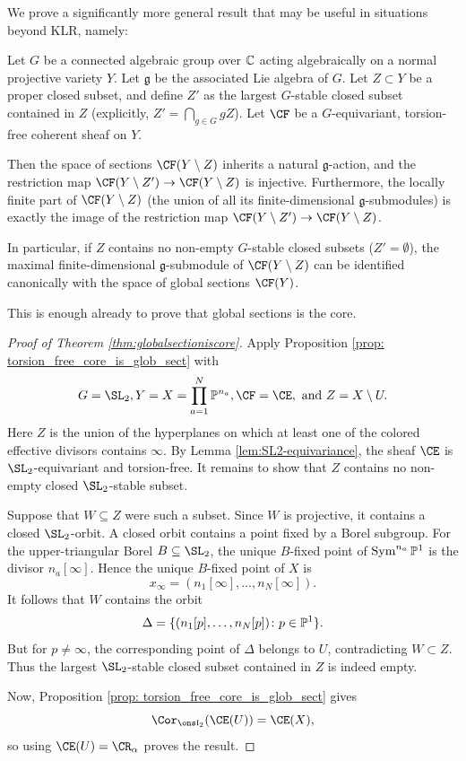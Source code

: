 \documentclass[11pt,reqno]{amsart}
\newcommand{\MHL}[1]{{\color{blue}{MHL: #1}}}
\newcommand{\FZ}[1]{{\color{orange}{FZ: #1}}}
\begin{document}
We prove a significantly more general result that may be useful in situations beyond KLR, namely:
\begin{proposition}\label{prop: torsion_free_core_is_glob_sect}
    Let $G$ be a connected algebraic group over $\mathbb C$ acting algebraically on a normal projective variety $Y$. Let $\mathfrak{g}$ be the associated Lie algebra of $G$. Let $Z \subset Y$ be a proper closed subset, and define $Z'$ as the largest $G$-stable closed subset contained in $Z$ (explicitly, $Z' = \bigcap_{g\in G} gZ$). Let $\CF$ be a $G$-equivariant, torsion-free coherent sheaf on $Y$.
    
    Then the space of sections $\CF(Y \setminus Z)$ inherits a natural $\mathfrak{g}$-action, and the restriction map $\CF(Y \setminus Z') \to \CF(Y \setminus Z)$ is injective. Furthermore, the locally finite part of $\CF(Y \setminus Z)$ (the union of all its finite-dimensional $\mathfrak{g}$-submodules) is exactly the image of the restriction map $\CF(Y \setminus Z') \to \CF(Y \setminus Z)$.
    
    In particular, if $Z$ contains no non-empty $G$-stable closed subsets ($Z' = \emptyset$), the maximal finite-dimensional $\mathfrak{g}$-submodule of $\CF(Y \setminus Z)$ can be identified canonically with the space of global sections $\CF(Y)$.
\end{proposition}
This is enough already to prove that global sections is the core.
\begin{proof}[Proof of Theorem \ref{thm:globalsectioniscore}]
Apply Proposition \ref{prop: torsion_free_core_is_glob_sect} with \[G=\SL_2,Y=X=\prod_{a=1}^N\BP^{n_a},\CF=\CE, \text{ and }Z=X\setminus U.\]Here $Z$ is the union of the hyperplanes on which at least one of the colored effective divisors contains $\infty$. By Lemma \ref{lem:SL2-equivariance}, the sheaf $\CE$ is $\SL_2$-equivariant and torsion-free. It remains to show that $Z$ contains no non-empty closed $\SL_2$-stable subset.

Suppose that $W\subseteq Z$ were such a subset. Since $W$ is projective, it contains a closed $\SL_2$-orbit. A closed orbit contains a point fixed by a Borel subgroup. For the upper-triangular Borel $B\subseteq\SL_2$, the unique $B$-fixed point of $\operatorname{Sym}^{n_a}\mathbb P^1$ is the divisor $n_a[\infty]$. Hence the unique $B$-fixed point of $X$ is \[x_\infty=(n_1[\infty],\ldots,n_N[\infty]).\] It follows that $W$ contains the orbit\[\Delta=\{(n_1[p],\ldots,n_N[p])\colon p\in\mathbb P^1\}.\]But for $p\ne\infty$, the corresponding point of $\Delta$ belongs to $U$, contradicting $W\subset Z$. Thus the largest $\SL_2$-stable closed subset contained in $Z$ is indeed empty.

Now, Proposition \ref{prop: torsion_free_core_is_glob_sect} gives 
\[\Cor_{\sl_2}(\CE(U))=\CE(X),\] so using $\CE(U)=\CR_\alpha$ proves the result.
\end{proof}
\end{document}
